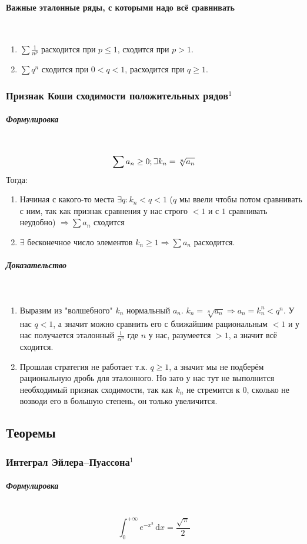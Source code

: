 \documentclass{article}
\def\letus{%
\mathord{\setbox0=\hbox{$\exists$}%
         \hbox{\kern 0.125\wd0%
               \vbox to \ht0{%
                  \hrule width 0.75\wd0%
                  \vfill%
                  \hrule width 0.75\wd0}%
               \vrule height \ht0%
               \kern 0.125\wd0}%
       }%
        }
\def\D{\,\mathrm{d}}
\let\vanillaparagraph\paragraph
\let\vanillasubparagraph\subparagraph
\renewcommand{\paragraph}[1]{\vanillaparagraph{#1}\mbox{}\\}
\renewcommand{\subparagraph}[1]{\vanillasubparagraph{#1}\mbox{}\\}
\begin{document}
\paragraph{Важные эталонные ряды, с которыми надо всё сравнивать}
\begin{enumerate}
    \item $\sum \frac{1}{n^p}$ расходится при $p \le 1$, сходится при $p > 1$.
    \item $\sum q^n$ сходится при $0 < q < 1$, расходится при $q \ge 1$.
\end{enumerate}

\subsubsection{Признак Коши сходимости положительных рядов\texorpdfstring{$^1$}{}}
\label{КошиРяды}
\subparagraph{Формулировка}
$$
\sum a_n \ge 0; \letus k_n = \sqrt[n]{a_n}
$$
Тогда:
\begin{enumerate}
    \item Начиная с какого-то места $\exists q : k_n < q < 1$ ($q$ мы ввели чтобы потом сравнивать с ним, так как признак сравнения у нас строго $<1$ и с $1$ сравнивать неудобно) $\Rightarrow \sum a_n$ сходится
    \item $\exists$ бесконечное число элементов $k_n \ge 1 \Rightarrow \sum a_n$ расходится.
\end{enumerate}

\subparagraph{Доказательство}
\begin{enumerate}
    \item Выразим из "волшебного" $k_n$ нормальный $a_n$. $k_n = \sqrt[n]{a_n} \Rightarrow a_n = k_n^n < q^n$. У нас $q < 1$, а значит можно сравнить его с ближайшим рациональным $<1$ и у нас получается эталонный $\frac{1}{\alpha^n}$ где $n$ у нас, разумеется $> 1$, а значит всё сходится.
    \item Прошлая стратегия не работает т.к. $q \ge 1$, а значит мы не подберём рациональную дробь для эталонного. Но зато у нас тут не выполнится необходимый признак сходимости, так как $k_n$ не стремится к 0, сколько не возводи его в большую степень, он только увеличится.
\end{enumerate}

\newpage
\subsection{Теоремы}
\subsubsection{Интеграл Эйлера--Пуассона\texorpdfstring{$^1$}{}}\label{ИЭП}
\subparagraph{Формулировка}
$$
\int_0^{+\infty}e^{-x^2}\D x = \frac{\sqrt{\pi}}{2}
$$
\end{document}

